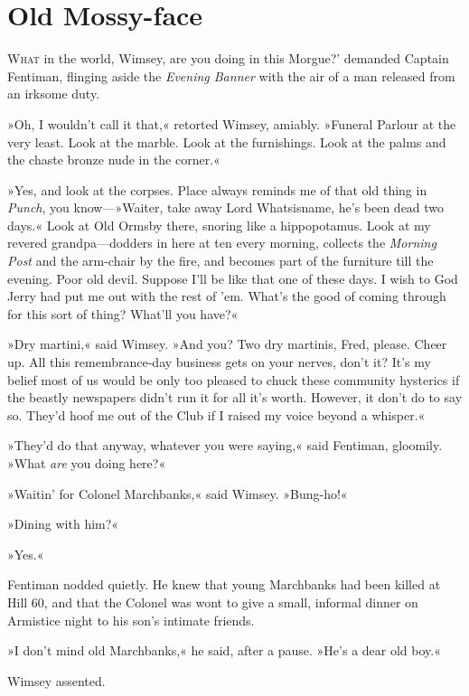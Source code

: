 \chapter{Old Mossy-face}
\lettrine[lines=4,ante=‘]{W}{hat} in the world, Wimsey, are you doing in this \newline Morgue?' demanded Captain Fentiman, flinging aside the \textit{Evening Banner} with the air of a man released from an irksome duty.

\zz
»Oh, I wouldn't call it that,« retorted Wimsey, amiably. »Funeral Parlour at the very least. Look at the marble. Look at the furnishings. Look at the palms and the chaste bronze nude in the corner.«

»Yes, and look at the corpses. Place always reminds me of that old thing in \textit{Punch}, you know—»Waiter, take away Lord Whatsisname, he's been dead two days.« Look at Old Ormsby there, snoring like a hippopotamus. Look at my revered grandpa—dodders in here at ten every morning, collects the \textit{Morning Post} and the arm-chair by the fire, and becomes part of the furniture till the evening. Poor old devil. Suppose I'll be like that one of these days. I wish to God Jerry had put me out with the rest of 'em. What's the good of coming through for this sort of thing? What'll you have?«

»Dry martini,« said Wimsey. »And you? Two dry martinis, Fred, please. Cheer up. All this remembrance-day business gets on your nerves, don't it? It's my belief most of us would be only too pleased to chuck these community hysterics if the beastly newspapers didn't run it for all it's worth. However, it don't do to say so. They'd hoof me out of the Club if I raised my voice beyond a whisper.«

»They'd do that anyway, whatever you were saying,« said Fentiman, gloomily. »What \textit{are} you doing here?«

»Waitin' for Colonel Marchbanks,« said Wimsey. »Bung-ho!«

»Dining with him?«

»Yes.«

Fentiman nodded quietly. He knew that young Marchbanks had been killed at Hill 60, and that the Colonel was wont to give a small, informal dinner on Armistice night to his son's intimate friends.

»I don't mind old Marchbanks,« he said, after a pause. »He's a dear old boy.«

Wimsey assented.

